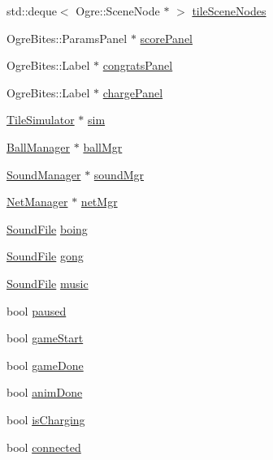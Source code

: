 \begin{DoxyCompactItemize}
std\-::deque$<$ Ogre\-::\-Scene\-Node $\ast$ $>$ \hyperlink{classTileGame_ac8b228c7849cb924a099f94de266c42d}{tile\-Scene\-Nodes}
\item 
Ogre\-Bites\-::\-Params\-Panel $\ast$ \hyperlink{classTileGame_a9a4d1b4dfacca55fdeacf454af04fa0c}{score\-Panel}
\item 
Ogre\-Bites\-::\-Label $\ast$ \hyperlink{classTileGame_a5e8deb9eb2903e1787a28699a9e6f346}{congrats\-Panel}
\item 
Ogre\-Bites\-::\-Label $\ast$ \hyperlink{classTileGame_a2f71619fb4d354c89fd37d460c0b1971}{charge\-Panel}
\item 
\hyperlink{classTileSimulator}{Tile\-Simulator} $\ast$ \hyperlink{classTileGame_a2225cb84303358e59c6093b8a999e085}{sim}
\item 
\hyperlink{classBallManager}{Ball\-Manager} $\ast$ \hyperlink{classTileGame_a7fe1ce6963e7ac2bd5022e653368c0ed}{ball\-Mgr}
\item 
\hyperlink{classSoundManager}{Sound\-Manager} $\ast$ \hyperlink{classTileGame_aca4c76a09f77a7f55ae0c4396f72aefc}{sound\-Mgr}
\item 
\hyperlink{classNetManager}{Net\-Manager} $\ast$ \hyperlink{classTileGame_a691f85c8b3c30335e6b8f6f83a8910ad}{net\-Mgr}
\item 
\hyperlink{SoundManager_8h_a05cf79926d9921eb07e70e460b021307}{Sound\-File} \hyperlink{classTileGame_a796c40847db5cd687417574064fbd90d}{boing}
\item 
\hyperlink{SoundManager_8h_a05cf79926d9921eb07e70e460b021307}{Sound\-File} \hyperlink{classTileGame_a6912a91d6b7eb2e88033d8571e3daecb}{gong}
\item 
\hyperlink{SoundManager_8h_a05cf79926d9921eb07e70e460b021307}{Sound\-File} \hyperlink{classTileGame_a6622c980107331b95697d74839dde768}{music}
\item 
bool \hyperlink{classTileGame_ac76eb85a5597f84146e49c92f7edc877}{paused}
\item 
bool \hyperlink{classTileGame_a276db8a3e88eea0914e6f6262791ee89}{game\-Start}
\item 
bool \hyperlink{classTileGame_a8fb8cd476fcf067cdfe0495fbf9f417e}{game\-Done}
\item 
bool \hyperlink{classTileGame_abdd2197b16e59e2035984882aaebf9e3}{anim\-Done}
\item 
bool \hyperlink{classTileGame_ac1c6b430452c30f0c546ac15918b765f}{is\-Charging}
\item 
bool \hyperlink{classTileGame_aa5b3986f4fdfaefddd5a85b796be3a36}{connected}
\item 

\end{DoxyCompactItemize}

